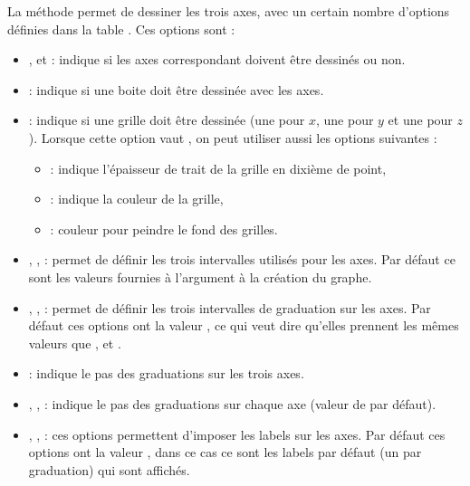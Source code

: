 La méthode  permet de dessiner les trois axes, avec un certain nombre d'options définies dans la table . Ces options sont :
\begin{itemize}
    \item {},  et  : indique si les axes correspondant doivent être dessinés ou non.

    \item {} : indique si une boite doit être dessinée avec les axes.

    \item {} : indique si une grille doit être dessinée (une pour $x$, une pour $y$ et une pour $z$). Lorsque cette option vaut \true, on peut utiliser aussi les options suivantes :
        \begin{itemize}
            \item {}: indique l'épaisseur de trait de la grille en dixième de point,
            \item {}: indique la couleur de la grille,
            \item {}: couleur pour peindre le fond des grilles.
        \end{itemize}
    
    \item {}, ,  : permet de définir les trois intervalles utilisés pour les axes. Par défaut ce sont les valeurs fournies à l'argument  à la création du graphe.

    \item {}, ,  : permet de définir les trois intervalles de graduation sur les axes. Par défaut ces options ont la valeur , ce qui veut dire qu'elles prennent les mêmes valeurs que ,  et .
    
    \item {} : indique le pas des graduations sur les trois axes.
    
    \item {}, ,  : indique le pas des graduations sur chaque axe (valeur de  par défaut).
    
    \item {}, ,  : ces options permettent d'imposer les labels sur les axes. Par défaut ces options ont la valeur \nil, dans ce cas ce sont les labels par défaut (un par graduation) qui sont affichés.
    

\end{itemize}
